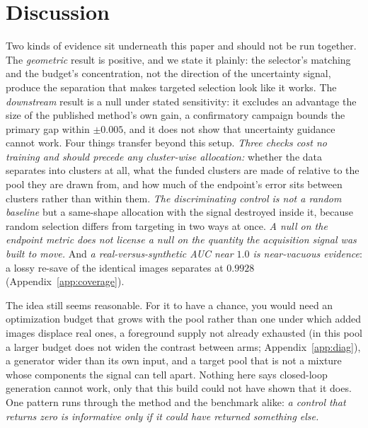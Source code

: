 \documentclass{article}
\newif\ifrevmarked \revmarkedtrue
\DeclareRobustCommand{\revB}[1]{\ifrevmarked{\color{RevB}#1}\else{#1}\fi}
\DeclareRobustCommand{\revC}[1]{\ifrevmarked{\color{RevC}#1}\else{#1}\fi}
\DeclareRobustCommand{\revShared}[1]{\ifrevmarked{\color{RevShared}#1}\else{#1}\fi}
\begin{document}
\section{Discussion}
\label{sec:discussion}
Two kinds of evidence sit underneath this paper and should not be run together. The
\emph{geometric} result is positive, and we state it \revB{plainly: the selector's matching and the budget's concentration}, not the
direction of the uncertainty signal, produce the separation that makes targeted selection look like it works. The \emph{downstream} result is a null under stated sensitivity: \revShared{it excludes an advantage the size of the published method's own gain, a confirmatory campaign bounds the primary gap within $\pm0.005$, and it} does not show that uncertainty guidance cannot work. Four things transfer beyond this setup. \textit{Three checks cost no training and should precede any
cluster-wise allocation:} whether the data separates into clusters at all, what the funded clusters
are made of relative to the pool they are drawn from, and how much of the endpoint's error sits
between clusters rather than within them. \textit{The discriminating control is not a random
baseline} but a same-shape allocation with the signal destroyed inside it, because random selection
differs from targeting in two ways at once. \textit{A null on the endpoint metric does not license a
null on the quantity the acquisition signal was built to move.} And \textit{a real-versus-synthetic AUC near $1.0$ is near-vacuous evidence}: a lossy re-save of the identical images separates at
$0.9928$ (Appendix~\ref{app:coverage}).

The idea still seems reasonable. For it to have a chance, you would need an optimization budget that
grows with the pool rather than one under which added images displace real ones, a foreground supply
not already exhausted \revC{(in this pool a larger budget does not widen the contrast between arms; Appendix~\ref{app:diag})}, a generator wider than its own input, and a target pool that is not a mixture
whose components the signal can tell apart. Nothing here says closed-loop generation cannot work,
only that this build could not have shown that it does. One pattern runs through the method and the
benchmark alike: \textit{a control that returns zero is informative only if it could have returned
something else.}
\end{document}
